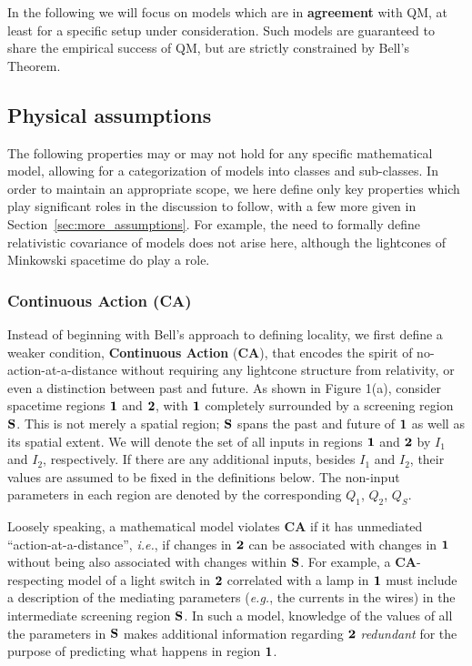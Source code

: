 \documentclass[rmp, aps, preprint, longbibliography]{revtex4-1}
\begin{document}
In the following we will focus on models which are in {\bf agreement} with QM, at least for a specific setup under consideration.  Such models are guaranteed to share the empirical success of QM, but are strictly constrained by Bell's Theorem.


\subsection{Physical assumptions}
\label{sec:assumptions}

The following properties may or may not hold for any specific mathematical model, allowing for a categorization of models into classes and sub-classes.  In order to maintain an appropriate scope, we here define only key properties which play significant roles in the discussion to follow, with a few more given in Section~\ref{sec:more_assumptions}.  For example, the need to formally define relativistic covariance of models does not arise here, although the lightcones of Minkowski spacetime do play a role.

\subsubsection{Continuous Action {\rm ({\bf CA})}}

Instead of beginning with Bell's approach to defining locality, we first define a weaker condition, {\bf Continuous Action} ({\bf CA}), that encodes the spirit of no-action-at-a-distance without requiring any lightcone structure from relativity, or even a distinction between past and future.  As shown in Figure 1(a), consider spacetime regions $\bf{1}$ and $\bf{2}$, with $\bf{1}$ completely surrounded by a screening region $\bf{S}$.  This is not merely a spatial region; $\bf{S}$ spans the past and future of $\bf{1}$ as well as its spatial extent.  We will denote the set of all inputs in regions $\bf{1}$ and $\bf{2}$ by $I_1$ and $I_2$, respectively.  If there are any additional inputs, besides $I_1$ and $I_2$, their values are assumed to be fixed in the definitions below. The non-input parameters in each region are denoted by the corresponding $Q_1$, $Q_2$, $Q_S$.

Loosely speaking, a mathematical model violates {\bf CA} if it has unmediated ``action-at-a-distance'', \emph{i.e.}, if changes in $\bf{2}$ can be associated with changes in $\bf{1}$ without being also associated with changes within $\bf{S}$.  For example, a {\bf CA}-respecting model of a light switch in $\bf{2}$ correlated with a lamp in $\bf{1}$ must include a description of the mediating parameters (\emph{e.g.}, the currents in the wires) in the intermediate screening region $\bf{S}$. In such a model, knowledge of the values of all the parameters in $\bf{S}$ makes additional information regarding $\bf{2}$ \emph{redundant} for the purpose of predicting what happens in region $\bf{1}$.
\end{document}
